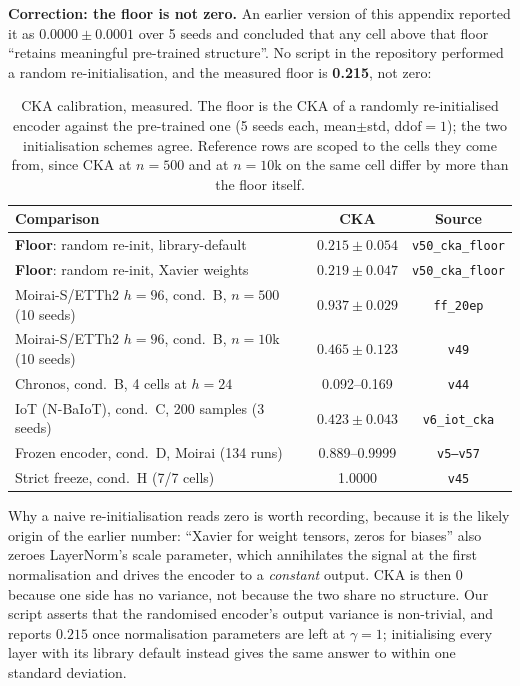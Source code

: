\textbf{Correction: the floor is not zero.}  An earlier version of this appendix
reported it as $0.0000{\pm}0.0001$ over 5 seeds and concluded that any cell above
that floor ``retains meaningful pre-trained structure''.  No script in the
repository performed a random re-initialisation, and the measured floor is
\textbf{0.215}, not zero:

\begin{table}[ht]
\centering
\caption{CKA calibration, measured.  The floor is the CKA of a randomly
re-initialised encoder against the pre-trained one (5 seeds each, mean$\pm$std,
$\text{ddof}{=}1$); the two initialisation schemes agree.  Reference rows are
scoped to the cells they come from, since CKA at $n{=}500$ and at $n{=}10$k on the
same cell differ by more than the floor itself.}
\label{tab:cka_calibration}
\small
\begin{tabular}{lcc}
\toprule
Comparison & CKA & Source \\
\midrule
\textbf{Floor}: random re-init, library-default & $\mathbf{0.215{\pm}0.054}$ & \texttt{v50\_cka\_floor} \\
\textbf{Floor}: random re-init, Xavier weights & $\mathbf{0.219{\pm}0.047}$ & \texttt{v50\_cka\_floor} \\
\midrule
Moirai-S/ETTh2 $h{=}96$, cond.\ B, $n{=}500$ (10 seeds) & $0.937{\pm}0.029$ & \texttt{ff\_20ep} \\
Moirai-S/ETTh2 $h{=}96$, cond.\ B, $n{=}10$k (10 seeds) & $0.465{\pm}0.123$ & \texttt{v49} \\
Chronos, cond.\ B, 4 cells at $h{=}24$ & 0.092--0.169 & \texttt{v44} \\
IoT (N-BaIoT), cond.\ C, 200 samples (3 seeds) & $0.423{\pm}0.043$ & \texttt{v6\_iot\_cka} \\
Frozen encoder, cond.\ D, Moirai (134 runs) & 0.889--0.9999 & \texttt{v5--v57} \\
Strict freeze, cond.\ H (7/7 cells) & 1.0000 & \texttt{v45} \\
\bottomrule
\end{tabular}
\end{table}

Why a naive re-initialisation reads zero is worth recording, because it is the
likely origin of the earlier number: ``Xavier for weight tensors, zeros for
biases'' also zeroes LayerNorm's scale parameter, which annihilates the signal at
the first normalisation and drives the encoder to a \emph{constant} output.  CKA
is then $0$ because one side has no variance, not because the two share no
structure.  Our script asserts that the randomised encoder's output variance is
non-trivial, and reports $0.215$ once normalisation parameters are left at
$\gamma{=}1$; initialising every layer with its library default instead gives the
same answer to within one standard deviation.

